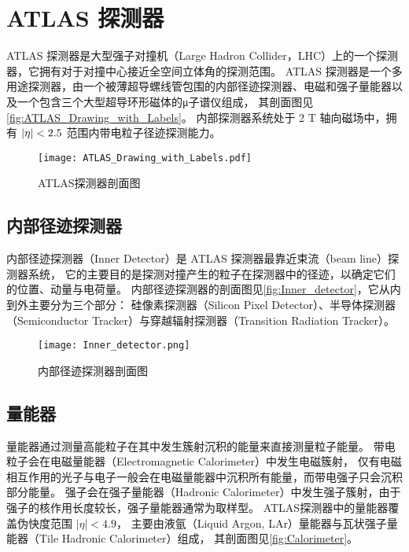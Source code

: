 
\chapter{ATLAS 探测器}
ATLAS 探测器是大型强子对撞机（Large Hadron Collider，LHC）上的一个探测器，它拥有对于对撞中心接近全空间立体角的探测范围。
ATLAS 探测器是一个多用途探测器，由一个被薄超导螺线管包围的内部径迹探测器、电磁和强子量能器以及一个包含三个大型超导环形磁体的μ子谱仪组成，
其剖面图见\autoref{fig:ATLAS_Drawing_with_Labels}。
内部探测器系统处于 2 T 轴向磁场中，拥有 $\abs{\eta} < 2.5$ 范围内带电粒子径迹探测能力。
\cite{ATLAS_detector}

\begin{figure}[ht]
    \centering
    \texttt{[image: ATLAS\_Drawing\_with\_Labels.pdf]}
    \caption{ATLAS探测器剖面图}
    \label{fig:ATLAS_Drawing_with_Labels}
\end{figure}


\section{内部径迹探测器}
内部径迹探测器（Inner Detector）是 ATLAS 探测器最靠近束流（beam line）探测器系统，
它的主要目的是探测对撞产生的粒子在探测器中的径迹，以确定它们的位置、动量与电荷量。
内部径迹探测器的剖面图见\autoref{fig:Inner_detector}，它从内到外主要分为三个部分：
硅像素探测器（Silicon Pixel Detector）、半导体探测器（Semiconductor Tracker）与穿越辐射探测器（Transition Radiation Tracker）。

\begin{figure}[ht]
    \centering
    \texttt{[image: Inner\_detector.png]}
    \caption{内部径迹探测器剖面图}
    \label{fig:Inner_detector}
\end{figure}



\section{量能器}
量能器通过测量高能粒子在其中发生簇射沉积的能量来直接测量粒子能量。
带电粒子会在电磁量能器（Electromagnetic Calorimeter）中发生电磁簇射，
仅有电磁相互作用的光子与电子一般会在电磁量能器中沉积所有能量，而带电强子只会沉积部分能量。
强子会在强子量能器（Hadronic Calorimeter）中发生强子簇射，由于强子的核作用长度较长，强子量能器通常为取样型。
ATLAS探测器中的量能器覆盖伪快度范围 \( |\eta| < 4.9 \)，
主要由液氩（Liquid Argon, LAr）量能器与瓦状强子量能器（Tile Hadronic Calorimeter）组成，
其剖面图见\autoref{fig:Calorimeter}。

